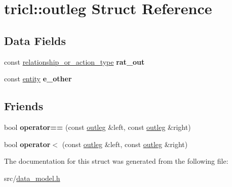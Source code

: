 \hypertarget{structtricl_1_1outleg}{}\section{tricl\+:\+:outleg Struct Reference}
\label{structtricl_1_1outleg}
\subsection*{Data Fields}
\begin{DoxyCompactItemize}
\item 
\mbox{\label{structtricl_1_1outleg_a9d277a290319b2f61d013edf38683552}} 
const \hyperlink{data__model_8h_a2d01894944fb58a8fedc0912a48d13f8}{relationship\+\_\+or\+\_\+action\+\_\+type} {\bfseries rat\+\_\+out}
\item 
\mbox{\label{structtricl_1_1outleg_a33ed4c9c3eabbb90ec66fe005d025ead}} 
const \hyperlink{data__model_8h_a57273122278e8b301844e2a2e1f0742f}{entity} {\bfseries e\+\_\+other}
\end{DoxyCompactItemize}
\subsection*{Friends}
\begin{DoxyCompactItemize}
\item 
\mbox{\label{structtricl_1_1outleg_a925572d2a4bc56d312134f995f7790a5}} 
bool {\bfseries operator==} (const \hyperlink{structtricl_1_1outleg}{outleg} \&left, const \hyperlink{structtricl_1_1outleg}{outleg} \&right)
\item 
\mbox{\label{structtricl_1_1outleg_a594b6be76b1271da95305f64d3f28f52}} 
bool {\bfseries operator$<$} (const \hyperlink{structtricl_1_1outleg}{outleg} \&left, const \hyperlink{structtricl_1_1outleg}{outleg} \&right)
\end{DoxyCompactItemize}


The documentation for this struct was generated from the following file\+:\begin{DoxyCompactItemize}
\item 
src/\hyperlink{data__model_8h}{data\+\_\+model.\+h}\end{DoxyCompactItemize}
